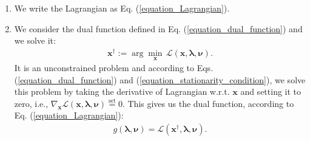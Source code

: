 \documentclass[lang=cn,10pt]{gorgeousnbook}
\numberwithin{equation}{section}%
\numberwithin{figure}{section}%
\begin{document}
\begin{enumerate}
\item We write the Lagrangian as Eq. (\ref{equation_Lagrangian}).
\item We consider the dual function defined in Eq. (\ref{equation_dual_function}) and we solve it: 
\begin{align}\label{equation_KKT_x_dagger}
\boldsymbol{x}^\dagger := \arg \min_{\boldsymbol{x}}\, \mathcal{L}(\boldsymbol{x},\boldsymbol{\lambda},\boldsymbol{\nu}). 
\end{align}
It is an unconstrained problem and according to Eqs. (\ref{equation_dual_function}) and (\ref{equation_stationarity_condition}), we solve this problem by taking the derivative of Lagrangian w.r.t. $\boldsymbol{x}$ and setting it to zero, i.e., $\nabla_{\boldsymbol{x}}\mathcal{L}(\boldsymbol{x},\boldsymbol{\lambda},\boldsymbol{\nu}) \overset{\text{set}}{=} 0$.
This gives us the dual function, according to Eq. (\ref{equation_Lagrangian}):
\begin{align}
g(\boldsymbol{\lambda}, \boldsymbol{\nu}) = \mathcal{L}(\boldsymbol{x}^\dagger,\boldsymbol{\lambda},\boldsymbol{\nu}). 
\end{align}


\end{enumerate}
\end{document}
